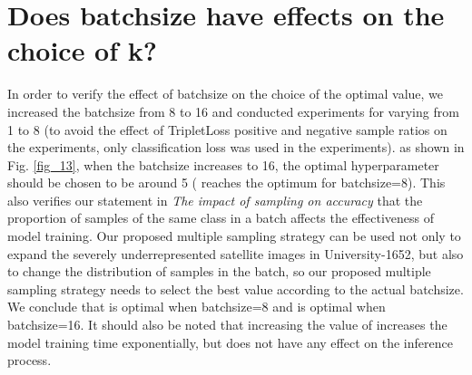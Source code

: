 \documentclass[lettersize,journal]{IEEEtran}
\begin{document}
{\section{Does batchsize have effects on the choice of k?}
In order to verify the effect of batchsize on the choice of the optimal  value, we increased the batchsize from 8 to 16 and conducted experiments for  varying from 1 to 8 (to avoid the effect of TripletLoss positive and negative sample ratios on the experiments, only classification loss was used in the experiments). as shown in Fig. \ref{fig_13}, when the batchsize increases to 16, the optimal hyperparameter  should be chosen to be around 5 ( reaches the optimum for batchsize=8). This also verifies our statement in \emph{The impact of sampling on accuracy} that the proportion of samples of the same class in a batch affects the effectiveness of model training. Our proposed multiple sampling strategy can be used not only to expand the severely underrepresented satellite images in University-1652, but also to change the distribution of samples in the batch, so our proposed multiple sampling strategy needs to select the best  value according to the actual batchsize. We conclude that  is optimal when batchsize=8 and  is optimal when batchsize=16. It should also be noted that increasing the value of  increases the model training time exponentially, but does not have any effect on the inference process.
}





\end{document}
